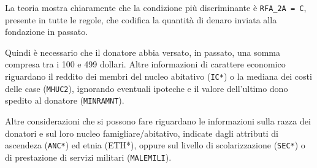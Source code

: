 La teoria mostra chiaramente che la condizione più discriminante è \verb|RFA_2A = C|, presente in tutte le regole, che codifica la quantità di denaro inviata alla fondazione in passato.

Quindi è necessario che il donatore abbia versato, in passato, una somma compresa tra i 100 e 499 dollari. Altre informazioni di carattere economico riguardano il reddito dei membri del nucleo abitativo (\texttt{IC*}) o la mediana dei costi delle case (\texttt{MHUC2}), ignorando eventuali ipoteche e il valore dell'ultimo dono spedito al donatore (\texttt{MINRAMNT}).

Altre considerazioni che si possono fare riguardano le informazioni sulla razza dei donatori e sul loro nucleo famigliare/abitativo, indicate dagli attributi di ascendeza (\texttt{ANC*}) ed etnia (\textsc{ETH*}), oppure sul livello di scolarizzazione (\texttt{SEC*}) o di prestazione di servizi militari (\texttt{MALEMILI}).


